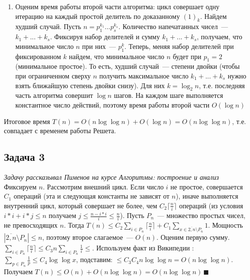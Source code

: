 \documentclass[a4paper]{article}
\begin{document}
\begin{enumerate}
\begin{enumerate}
\item Оценим время работы второй части алгоритма: цикл совершает одну итерацию на каждый простой делитель по доказанному $(1)_k$. Найдем худший случай. Пусть $n=p_1^{k_1}...p_s^{k_s}$. Количество напечатанных чисел~--- $k_1+...+k_s$. Фиксируя набор делителей и сумму $k_1+...+k_s$, получаем, что минимальное число $n$ при них~--- $p_1^k$. Теперь, меняя набор делителей при фиксированном $k$ найдем, что минимальное число $n$ будет при $p_1=2$ (минимальное простое). То есть, худший случай~--- степени двойки (чтобы при ограниченном сверху $n$ получить максимальное число $k_1+...+k_s$ нужно взять ближайшую степень двойки снизу). Для них $k=\log_2 n$, т.е. последняя часть алгоритма совершит $\log n$ шагов. На каждом шаге выполняется константное число действий, поэтому время работы второй части $O(\log n)$
\end{enumerate}
Итоговое время $T(n)=O(n\log\log n)+O(\log n)=O(n\log\log n)$, т.е. совпадает с временем работы Решета.
\end{enumerate}
\subsection*{Задача 3}
{\em Задачу рассказывал Пименов на курсе Алгоритмы: построение и анализ}\newline
Фиксируем $n$. Рассмотрим внешний цикл. Если число $i$ не простое, совершается $C_1$ операций (эта и следующая константы не зависят от $n$), иначе выполняется внутренний цикл, который совершает не более, чем $C_2\lceil\frac{n}{i}\rceil$ операций (из условия $i*i+i*j\leqslant n$ получаем $j\leqslant \frac{n-i*i}{i}\leqslant\frac{n}{i}$). Пусть $P_n$~--- множество простых чисел, не превосходящих $n$. Тогда $T(n)\leqslant C_2\sum\limits_{i\in P_n}\lceil\frac{n}{i}\rceil+C_1\sum\limits_{x\in\overline{2,n}\setminus P_n} 1$. Мощность $|\overline{2,n}\setminus P_n|\leqslant n$, поэтому второе слагаемое~--- $O(n)$.\newline
Оценим первую сумму. $\sum\limits_{i\in P_n}\lceil\frac{n}{i}\rceil\leqslant C_3n\sum\limits_{i\in P_n}\frac{1}{i}\boxed{\leqslant}$.\newline
Используем факт из Википедии \cite{wiki_primes}: $\sum\limits_{p\in P_n}\frac{1}{p}\leqslant C_4\log\log x$, подставим: $\boxed{\leqslant}C_3C_4n\log\log n=O(n\log\log n)$.\newline
Получаем $T(n)\leqslant O(n)+O(n\log\log n)=O(n\log\log n)\,\blacksquare$
\end{document}

